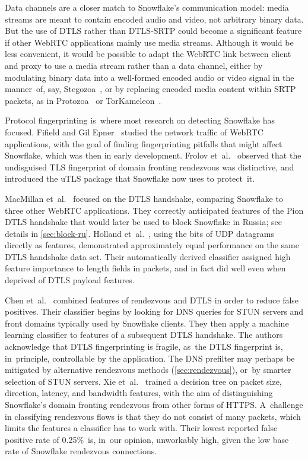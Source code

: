 \documentclass[letterpaper,twocolumn]{article}
\begin{document}
\begin{description}
Data channels are a closer match to Snowflake's communication model:
media streams are meant to contain encoded audio and video,
not arbitrary binary data.
But the use of DTLS rather than DTLS-SRTP could become
a significant feature if other WebRTC applications mainly use media streams.
Although it would be less convenient,
it would be possible to adapt the WebRTC link between
client and proxy
to use a media stream rather than a data channel,
either by modulating binary data into a well-formed encoded
audio or video signal in the manner~of, say,
Stegozoa~\cite[\S 3.3]{Figueira2022a},
or by replacing encoded media content within SRTP packets,
as in Protozoa~\cite[\S 4.4]{Barradas2020a}
or TorKameleon~\cite[\S \mbox{III-D}]{arxiv.2303.17544}.

\end{description}

Protocol fingerprinting
is~where most research on detecting Snowflake has focused.
Fifield and Gil Epner~\cite{arxiv.1605.08805}
studied the network traffic of WebRTC applications,
with the goal of finding fingerprinting pitfalls
that might affect Snowflake,
which was then in early development.
Frolov et~al.~\cite[\S \mbox{V-C}]{Frolov2019a}
observed that the undisguised TLS fingerprint
of domain fronting rendezvous was distinctive,
and introduced the uTLS package that Snowflake
now uses to protect~it.

MacMillan et~al.~\cite{arxiv.2008.03254}
focused on the DTLS handshake,
comparing Snowflake to three other WebRTC applications.
They correctly anticipated features
of the Pion DTLS handshake
that would later be used
to block Snowflake in Russia;
see details in \autoref{sec:block-ru}.
Holland et~al.~\cite[\S 5.3]{Holland2021a},
using the bits of UDP datagrams directly as features,
demonstrated approximately equal performance
on the same DTLS handshake data set.
Their automatically derived classifier assigned high feature importance
to length fields in packets,
and in fact did well even when deprived of DTLS payload features.

Chen et~al.~\cite{Chen2023a}
combined features
of rendezvous and DTLS
in order to reduce false positives.
Their classifier begins
by looking for DNS queries for
STUN servers and front domains typically used by Snowflake clients.
They then apply a machine learning classifier
to features of a subsequent DTLS handshake.
The authors acknowledge that DTLS fingerprinting
is fragile, as~the DTLS fingerprint is, in~principle,
controllable by the application.
The DNS prefilter may perhaps be mitigated
by alternative rendezvous methods (\autoref{sec:rendezvous}),
or~by smarter selection of STUN servers.
Xie et~al.~\cite{Xie2023a} trained a decision tree on
packet size, direction, latency, and bandwidth features, with the aim of
distinguishing Snowflake's domain fronting rendezvous
from other forms of HTTPS.
A~challenge in classifying rendezvous flows
is that they do not consist of many packets,
which limits the features a classifier has to work with.
Their lowest reported false positive rate of 0.25\%~is,
in~our opinion, unworkably high,
given the low base rate of Snowflake rendezvous connections.
\end{document}
